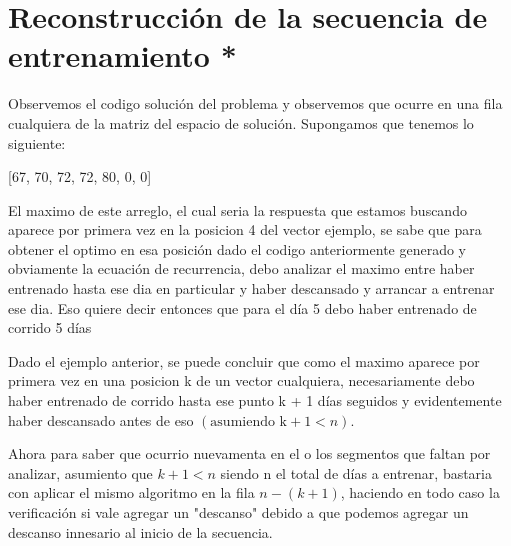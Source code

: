\section{Reconstrucción de la secuencia de entrenamiento *}

Observemos el codigo solución del problema y observemos que ocurre en una fila cualquiera de la matriz del espacio de solución. Supongamos que tenemos lo siguiente:

        [67, 70, 72, 72, 80, 0, 0]

El maximo de este arreglo, el cual seria la respuesta que estamos buscando aparece por primera vez en la posicion 4 del vector ejemplo, se sabe que para obtener el optimo en esa posición dado el codigo anteriormente generado y obviamente la ecuación de recurrencia, debo analizar el maximo entre haber entrenado hasta ese dia en particular y haber descansado y arrancar a entrenar ese dia. Eso quiere decir entonces que para el día 5 debo haber entrenado de corrido 5 días

Dado el ejemplo anterior, se puede concluir que como el maximo aparece por primera vez en una posicion k de un vector cualquiera, necesariamente debo haber entrenado de corrido hasta ese punto k + 1 días seguidos y evidentemente haber descansado antes de eso $(\text{asumiendo k}  + 1 < n)$.

Ahora para saber que ocurrio nuevamenta en el o los segmentos que faltan por analizar, asumiento que $k + 1 < n$ siendo n el total de días a entrenar, bastaria con aplicar el mismo algoritmo en la fila $n - (k + 1)$, haciendo en todo caso la verificación si vale agregar un "descanso" debido a que podemos agregar un descanso innesario al inicio de la secuencia. 